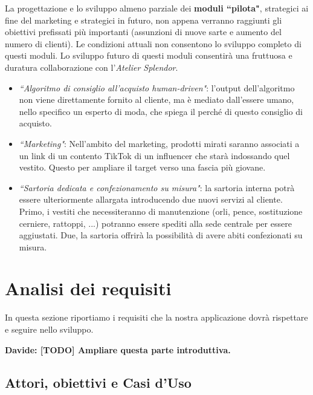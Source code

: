 \documentclass[12pt]{article}
\newcommand{\davide}[1]{{\bf \color{chromeyellow} Davide: #1 }}
\begin{document}
La progettazione e lo sviluppo almeno parziale dei \textbf{moduli ``pilota"}, strategici ai fine del marketing e strategici in futuro, non appena verranno raggiunti gli obiettivi prefissati più importanti (assunzioni di nuove sarte e aumento del numero di clienti). Le condizioni attuali non consentono lo sviluppo completo di questi moduli. Lo sviluppo futuro di questi moduli consentirà una fruttuosa e duratura collaborazione con l'{\em Atelier Splendor}.
\begin{itemize}
    \item {\em ``Algoritmo di consiglio all'acquisto human-driven"}: l'output dell'algoritmo non viene direttamente fornito al cliente, ma è mediato dall'essere umano, nello specifico un esperto di moda, che spiega il perché di questo consiglio di acquisto.
    \item {\em ``Marketing"}: Nell'ambito del marketing, prodotti mirati saranno associati a un link di un contento TikTok di un influencer che starà indossando quel vestito. Questo per ampliare il target verso una fascia più giovane.
    \item {\em ``Sartoria dedicata e confezionamento su misura"}: la sartoria interna potrà essere ulteriormente allargata introducendo due nuovi servizi al cliente. Primo, i vestiti che necessiteranno di manutenzione (orli, pence, sostituzione cerniere, rattoppi, ...) potranno essere spediti alla sede centrale per essere aggiustati. Due, la sartoria offrirà la possibilità di avere abiti confezionati su misura.
\end{itemize}


\section{Analisi dei requisiti}

In questa sezione riportiamo i requisiti che la nostra applicazione dovrà rispettare e seguire nello sviluppo.

\davide{\textbf{[TODO]} Ampliare questa parte introduttiva.}

\subsection{Attori, obiettivi e Casi d'Uso}
\label{subsec:UC}
\end{document}
